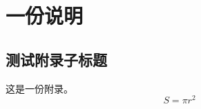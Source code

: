 
\chapter{一份说明}

\section{测试附录子标题}

这是一份附录。
\begin{equation}
    S = \pi r^2
\end{equation}

\cleardoublepage